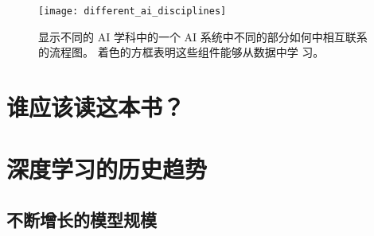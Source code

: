 \begin{figure}[h]
  \centering
  \texttt{[image: different\_ai\_disciplines]}
  \caption{显示不同的 AI 学科中的一个 AI 系统中不同的部分如何中相互联系的流程图。
    着色的方框表明这些组件能够从数据中学
    习。\label{fig:different_ai_disciplines}}
\end{figure}

\section{谁应该读这本书？}

\section{深度学习的历史趋势}



\subsection{不断增长的模型规模}
\label{subsec:increasing_model_sizes}
